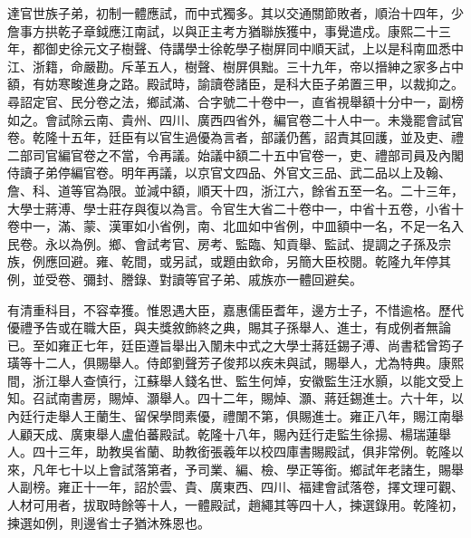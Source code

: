\begin{pinyinscope}
達官世族子弟，初制一體應試，而中式獨多。其以交通關節敗者，順治十四年，少詹事方拱乾子章鉞應江南試，以與正主考方猶聯族獲中，事覺遣戍。康熙二十三年，都御史徐元文子樹聲、侍講學士徐乾學子樹屏同中順天試，上以是科南皿悉中江、浙籍，命嚴勘。斥革五人，樹聲、樹屏俱黜。三十九年，帝以搢紳之家多占中額，有妨寒畯進身之路。殿試時，諭讀卷諸臣，是科大臣子弟置三甲，以裁抑之。尋詔定官、民分卷之法，鄉試滿、合字號二十卷中一，直省視舉額十分中一，副榜如之。會試除云南、貴州、四川、廣西四省外，編官卷二十人中一。未幾罷會試官卷。乾隆十五年，廷臣有以官生過優為言者，部議仍舊，詔責其回護，並及吏、禮二部司官編官卷之不當，令再議。始議中額二十五中官卷一，吏、禮部司員及內閣侍讀子弟停編官卷。明年再議，以京官文四品、外官文三品、武二品以上及翰、詹、科、道等官為限。並減中額，順天十四，浙江六，餘省五至一名。二十三年，大學士蔣溥、學士莊存與復以為言。令官生大省二十卷中一，中省十五卷，小省十卷中一，滿、蒙、漢軍如小省例，南、北皿如中省例，中皿額中一名，不足一名入民卷。永以為例。鄉、會試考官、房考、監臨、知貢舉、監試、提調之子孫及宗族，例應回避。雍、乾間，或另試，或題由欽命，另簡大臣校閱。乾隆九年停其例，並受卷、彌封、謄錄、對讀等官子弟、戚族亦一體回避矣。

有清重科目，不容幸獲。惟恩遇大臣，嘉惠儒臣耆年，邊方士子，不惜逾格。歷代優禮予告或在職大臣，與夫獎敘飾終之典，賜其子孫舉人、進士，有成例者無論已。至如雍正七年，廷臣遵旨舉出入闈未中式之大學士蔣廷錫子溥、尚書嵇曾筠子璜等十二人，俱賜舉人。侍郎劉聲芳子俊邦以疾未與試，賜舉人，尤為特典。康熙間，浙江舉人查慎行，江蘇舉人錢名世、監生何焯，安徽監生汪水顥，以能文受上知。召試南書房，賜焯、灝舉人。四十二年，賜焯、灝、蔣廷錫進士。六十年，以內廷行走舉人王蘭生、留保學問素優，禮闈不第，俱賜進士。雍正八年，賜江南舉人顧天成、廣東舉人盧伯蕃殿試。乾隆十八年，賜內廷行走監生徐揚、楊瑞蓮舉人。四十三年，助教吳省蘭、助教銜張羲年以校四庫書賜殿試，俱非常例。乾隆以來，凡年七十以上會試落第者，予司業、編、檢、學正等銜。鄉試年老諸生，賜舉人副榜。雍正十一年，詔於雲、貴、廣東西、四川、福建會試落卷，擇文理可觀、人材可用者，拔取時餘等十人，一體殿試，趙繩其等四十人，揀選錄用。乾隆初，揀選如例，則邊省士子猶沐殊恩也。


\end{pinyinscope}
